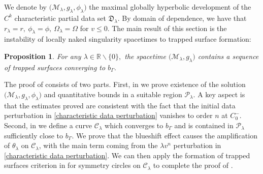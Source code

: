 \documentclass[11pt]{article}
\newtheorem{proposition}{Proposition}[section]
\numberwithin{equation}{section}
\begin{document}
We denote by $\big(\mathcal{M}_{\lambda},g_{\lambda},\phi_{\lambda}\big)$ the maximal globally hyperbolic development of the $C^k$ characteristic partial data set $\mathfrak{D}_{\lambda}$. By domain of dependence, we have that $r_{\lambda}=r,\ \phi_{\lambda}=\phi,\ \Omega_{\lambda}=\Omega$ for $v\leq 0.$ The main result of this section is the instability of locally naked singularity spacetimes to trapped surface formation:

\begin{proposition}\label{instability to trapped surfaces proposition}
    For any $\lambda\in\mathbb{R}\backslash\{0\},$ the spacetime $\big(\mathcal{M}_{\lambda},g_{\lambda}\big)$ contains a sequence of trapped surfaces converging to $b_{\Gamma}.$
\end{proposition}

The proof of  consists of two parts. First, in  we prove existence of the solution $\big(\mathcal{M}_{\lambda},g_{\lambda},\phi_{\lambda}\big)$ and quantitative bounds in a suitable region $\mathcal{P}_{\lambda}.$ A key aspect is that the estimates proved are consistent with the fact that the initial data perturbation in \eqref{characteristic data perturbation} vanishes to order $n$ at $C_0^-.$ Second, in  we define a curve $\mathcal{C}_{\lambda}$ which converges to $b_{\Gamma}$ and is contained in $\mathcal{P}_{\lambda}$ sufficiently close to $b_{\Gamma}$. We prove that the blueshift effect causes the amplification of $\theta_{\lambda}$ on $\mathcal{C}_{\lambda}$, with the main term coming from the $\lambda v^n$ perturbation in \eqref{characteristic data perturbation}. We can then apply the formation of trapped surfaces criterion in  for symmetry circles on $\mathcal{C}_{\lambda}$ to complete the proof of .
\end{document}

